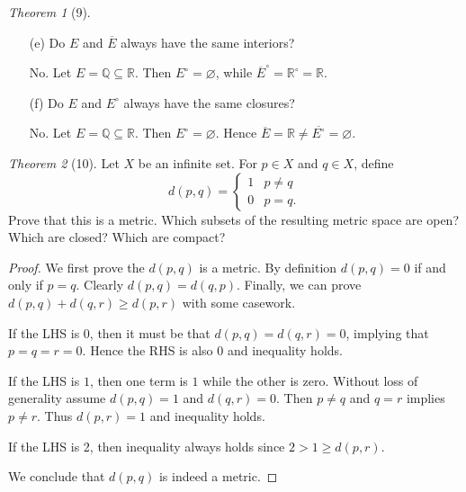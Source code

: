 \documentclass[12pt]{article}
\theoremstyle{remark}
\theoremstyle{named}
\newtheorem*{theorem}{Theorem}
\begin{document}
\begin{theorem}[9]
\begin{enumerate}
\begin{proof}
            For the other inclusion, since $E^\circ \subseteq E$, we have $E^c \subseteq (E^\circ)^c$. Hence $\overline{E^c} \subseteq \overline{(E^\circ)^c} = (E^\circ)^c$. The last equality comes from the fact that, since $E^\circ$ is open, $(E^\circ)^c$ must be closed. This completes the proof.
        \end{proof}
        
        \item[(e)] Do $E$ and $\overline E$ always have the same interiors?
        
        No. Let $E = \mathbb Q \subseteq \mathbb R$. Then $E^\circ = \varnothing$, while $\overline E ^\circ = \mathbb R ^\circ = \mathbb R$.

        \item[(f)] Do $E$ and $E^\circ$ always have the same closures?
        
        No. Let $E = \mathbb Q \subseteq \mathbb R$. Then $E^\circ = \varnothing$. Hence $\overline E = \mathbb R \neq \overline{E^\circ} = \varnothing$. 
    \end{enumerate}
\end{theorem}

\begin{theorem}[10]
    Let $X$ be an infinite set. For $p \in X$ and $q \in X$, define 
    \[d(p, q) = 
    \begin{cases}
        1 & p \neq q \\ 0 & p = q.
    \end{cases}\]
    Prove that this is a metric. Which subsets of the resulting metric space are open? Which are closed? Which are compact?
\end{theorem}

\begin{proof}
    We first prove the $d(p, q)$ is a metric. By definition $d(p, q) = 0$ if and only if $p = q$. Clearly $d(p, q) = d(q, p)$. Finally, we can prove $d(p, q) + d(q, r) \ge d(p, r)$ with some casework. 
    
    If the LHS is 0, then it must be that $d(p, q) = d(q, r) = 0$, implying that $p = q = r = 0$. Hence the RHS is also $0$ and inequality holds.

    If the LHS is $1$, then one term is $1$ while the other is zero. Without loss of generality assume $d(p, q) = 1$ and $d(q, r) = 0$. Then $p \neq q$ and $q = r$ implies $p \neq r$. Thus $d(p, r) = 1$ and inequality holds. 

    If the LHS is 2, then inequality always holds since $2 > 1 \ge d(p, r)$.

    We conclude that $d(p, q)$ is indeed a metric. 
\end{proof}
\end{document}
